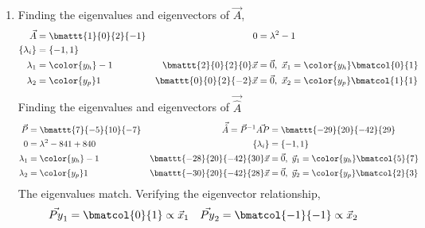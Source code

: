 \begin{enumerate}
    \item Finding the eigenvalues and eigenvectors of $ \vec{A} $,
          \begin{align}
              \vec{A}                      & = \bmattt{1}{0}{2}{-1} &
              0                            & = \lambda^2 - 1          \\
              \{\lambda_i\}                & = \{-1, 1\}              \\
              \lambda_1                    & = \color{y_h} -1       &
              \bmattt{2}{0}{2}{0} \vec{x}  & = \vec{0},\
              \vec{x}_1 = \color{y_h} \bmatcol{0}{1}                  \\
              \lambda_2                    & = \color{y_p} 1        &
              \bmattt{0}{0}{2}{-2} \vec{x} & = \vec{0},\
              \vec{x}_2 = \color{y_p} \bmatcol{1}{1}
          \end{align}
          Finding the eigenvalues and eigenvectors of $ \vec{\hat{A}} $
          \begin{align}
              \vec{P}                              & = \bmattt{7}{-5}{10}{-7}    &
              \vec{\hat{A}} = \vec{P}^{-1}\vec{AP} & = \bmattt{-29}{20}{-42}{29}   \\
              0                                    & = \lambda^2 - 841 + 840     &
              \{\lambda_i\}                        & = \{-1, 1\}                   \\
              \lambda_1                            & = \color{y_h} -1            &
              \bmattt{-28}{20}{-42}{30} \vec{x}    & = \vec{0},\
              \vec{y}_1 = \color{y_h} \bmatcol{5}{7}                               \\
              \lambda_2                            & = \color{y_p} 1             &
              \bmattt{-30}{20}{-42}{28} \vec{x}    & = \vec{0},\
              \vec{y}_2 = \color{y_p} \bmatcol{2}{3}
          \end{align}
          The eigenvalues match. Verifying the eigenvector relationship,
          \begin{align}
              \vec{Py}_1 & = \bmatcol{0}{1} \propto \vec{x}_1   &
              \vec{Py}_2 & = \bmatcol{-1}{-1} \propto \vec{x}_2
          \end{align}


\end{enumerate}
